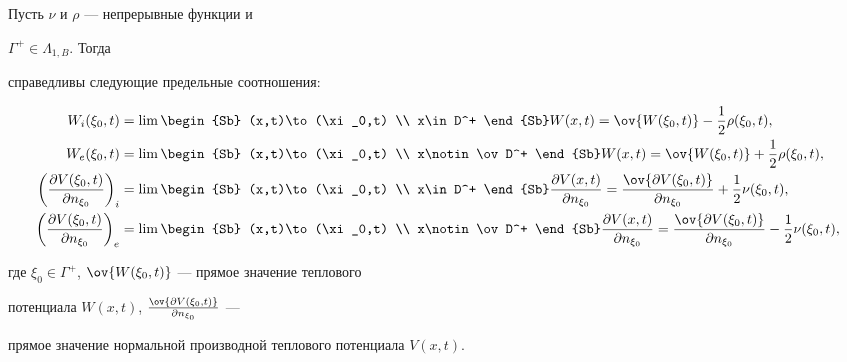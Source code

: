 \begin{thm} 


Пусть $\nu$ и $\rho$ --- непрерывные функции и 


$\Gamma^+\in\Lambda_{1,B}$. Тогда 


справедливы следующие предельные соотношения\/{:} 


\begin{align} 


W_i(\xi_0,t)&=\lim\begin{Sb} (x,t)\to(\xi_0,t) \\ x\in D^+ \end{Sb} 


W(x,t)=\ov{W(\xi_0,t)}-\frac{1}{2}\rho(\xi_0,t), \\ 


% 


W_e(\xi_0,t)&=\lim 


\begin{Sb} (x,t)\to(\xi_0,t) \\ x\notin \ov D^+ \end{Sb} 


W(x,t)=\ov{W(\xi_0,t)}+\frac{1}{2}\rho(\xi_0,t), \\ 


% 


\bigg(\frac{\partial V(\xi_0,t)}{\partial n_{\xi_0}}\bigg)_i&=\lim 


\begin{Sb} (x,t)\to(\xi_0,t) \\ x\in D^+ \end{Sb} 


\frac{\partial V(x,t)}{\partial n_{\xi_0}}= 


\frac{\ov{\partial V(\xi_0,t)}}{\partial n_{\xi_0}}+ 


\frac{1}{2}\nu(\xi_0,t), \\ 


% 


\bigg(\frac{\partial V(\xi_0,t)}{\partial n_{\xi_0}}\bigg)_e&=\lim 


\begin{Sb} (x,t)\to(\xi_0,t) \\ x\notin \ov D^+ \end{Sb} 


\frac{\partial V(x,t)}{\partial n_{\xi_0}}= 


\frac{\ov{\partial V(\xi_0,t)}}{\partial n_{\xi_0}}- 


\frac{1}{2}\nu(\xi_0,t), 


\end{align} 


где $\xi_0\in\Gamma^+$, $\ov{W(\xi_0,t)}$ --- прямое значение теплового 


потенциала $W(x,t)$, $\frac{\ov{\partial V(\xi_0,t)}}{\partial 


n_{\xi_0}}$ --- 


прямое значение нормальной производной теплового потенциала $V(x,t)$. 


\end{thm} 


